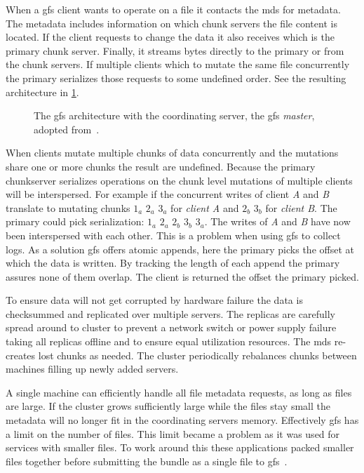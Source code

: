 When a \ac{gfs} client wants to operate on a file it contacts the \ac{mds} for metadata. The metadata includes information on which chunk servers the file content is located. If the client requests to change the data it also receives which is the primary chunk server. Finally, it streams bytes directly to the primary or from the chunk servers. If multiple clients which to mutate the same file concurrently the primary serializes those requests to some undefined order. See the resulting architecture in \cref{fig:GFS_arch}.
%
\begin{figure}[htbp]
	\centering
	
	\caption{The \ac{gfs} architecture with the coordinating server, the \ac{gfs} \textit{master}, adopted from~\cite{GFS}.}
	\label{fig:GFS_arch}
\end{figure}
%
When clients mutate multiple chunks of data concurrently and the mutations share one or more chunks the result are undefined. Because the primary chunkserver serializes operations on the chunk level mutations of multiple clients will be interspersed. For example if the concurrent writes of client \textit{A} and \textit{B} translate to mutating chunks $1_a$ $2_a$ $3_a$ for \textit{client A} and $2_b$ $3_b$ for \textit{client B}. The primary could pick serialization: $1_a$ $2_a$ $2_b$ $3_b$ $3_a$. The writes of \textit{A} and \textit{B} have now been interspersed with each other. This is a problem when using \ac{gfs} to collect logs. As a solution \ac{gfs} offers atomic appends, here the primary picks the offset at which the data is written. By tracking the length of each append the primary assures none of them overlap. The client is returned the offset the primary picked.

To ensure data will not get corrupted by hardware failure the data is checksummed and replicated over multiple servers. The replicas are carefully spread around to cluster to prevent a network switch or power supply failure taking all replicas offline and to ensure equal utilization resources. The \ac{mds} re-creates lost chunks as needed. The cluster periodically rebalances chunks between machines filling up newly added servers. 

A single machine can efficiently handle all file metadata requests, as long as files are large. If the cluster grows sufficiently large while the files stay small the metadata will no longer fit in the coordinating servers memory. Effectively \ac{gfs} has a limit on the number of files. This limit became a problem as it was used for services with smaller files. To work around this these applications packed smaller files together before submitting the bundle as a single file to \ac{gfs}~\cite{GFS_interview}.


